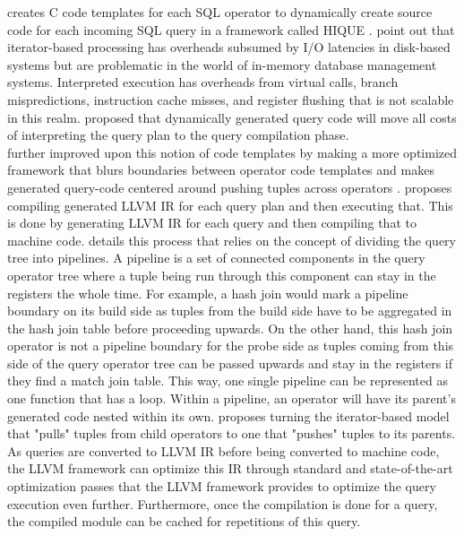 \documentclass[12pt]{cmuthesis}
\begin{document}
        \citeauthor{krikellas10} creates C code templates for each SQL operator to dynamically create source code for each incoming SQL query in a framework called HIQUE \cite{krikellas10}. \citeauthor{krikellas10} point out that iterator-based processing has overheads subsumed by I/O latencies in disk-based systems but are problematic in the world of in-memory database management systems. Interpreted execution has overheads from virtual calls, branch mispredictions, instruction cache misses, and register flushing that is not scalable in this realm. \citeauthor{krikellas10} proposed that dynamically generated query code will move all costs of interpreting the query plan to the query compilation phase.\\
         \citeauthor{neumann11} further improved upon this notion of code templates by making a more optimized framework that blurs boundaries between operator code templates and makes generated query-code centered around pushing tuples across operators \cite{neumann11}. \citeauthor{neumann11} proposes compiling generated LLVM IR for each query plan and then executing that.  This is done by generating LLVM IR for each query and then compiling that to machine code. \citeauthor{neumann11} details this process that relies on the concept of dividing the query tree into pipelines. A pipeline is a set of connected components in the query operator tree where a tuple being run through this component can stay in the registers the whole time. For example, a hash join would mark a pipeline boundary on its build side as tuples from the build side have to be aggregated in the hash join table before proceeding upwards. On the other hand, this hash join operator is not a pipeline boundary for the probe side as tuples coming from this side of the query operator tree can be passed upwards and stay in the registers if they find a match join table. This way, one single pipeline can be represented as one function that has a loop. Within a pipeline, an operator will have its parent's generated code nested within its own. \citeauthor{neumann11} proposes turning the iterator-based model that "pulls" tuples from child operators to one that "pushes" tuples to its parents. 
            As queries are converted to LLVM IR before being converted to machine code, the LLVM framework can optimize this IR through standard and state-of-the-art optimization passes that the LLVM framework provides to optimize the query execution even further. Furthermore, once the compilation is done for a query, the compiled module can be cached for repetitions of this query.\\
            
\end{document}
